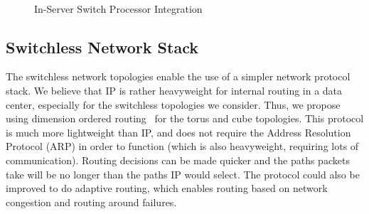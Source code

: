 \begin{figure}
    \centering
    ~
    \vspace{-0.07in}
    \caption{In-Server Switch Processor Integration}
    \label{fig:in_server_switch_design}
\end{figure}

\subsection{Switchless Network Stack}
\label{sec:arch:sec:net_stack}

The switchless network topologies enable the use of a simpler network protocol stack.  We believe that IP is rather heavyweight for internal routing in a data center, especially for the switchless topologies we consider.  Thus, we propose using dimension ordered routing~\cite{Ni:1993:SWRTDN} for the torus and cube topologies. This protocol is much more lightweight than IP, and does not require the Address Resolution Protocol (ARP) in order to function (which is also heavyweight, requiring lots of communication).  Routing decisions can be made quicker and the paths packets take will be no longer than the paths IP would select.  The protocol could also be improved to do adaptive routing, which enables routing based on network congestion and routing around failures.



